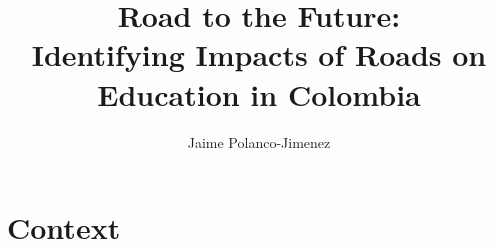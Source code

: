 \documentclass[9pt]{beamer}
\title[PhD in Economic Sciences]{Road to the Future: \\ Identifying Impacts of Roads on Education in Colombia}
\author[IEA World Congress 2023 ] {  Jaime Polanco-Jimenez\inst{1} }
\institute[KUL]
{\inst{1}
PhD Student -  Pontificia Universidad Javeriana \\  
 
\url{https://polanco-jaime.github.io/} \\
\date{}\\~\\
IEA World Congress 2023    \\

}
\begin{document}
\begin{frame}
    \maketitle
\end{frame}

 

 \section{Context }

\end{document}
